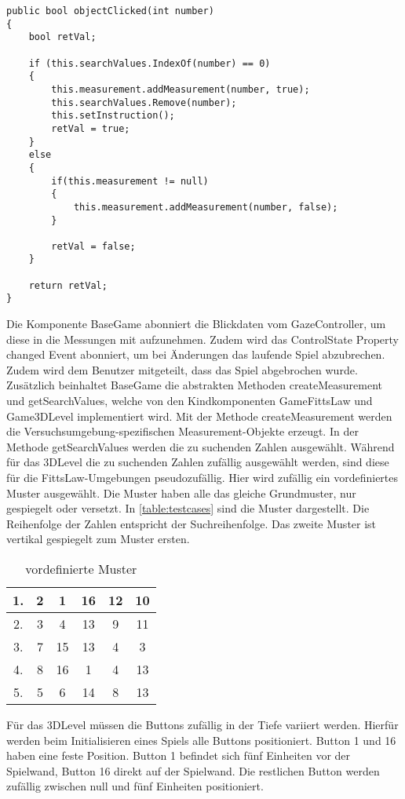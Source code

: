 \begin{lstlisting}[caption=Methode objectClicked,label=lstlisting:objectClicked,float=!htbp]
public bool objectClicked(int number)
{
	bool retVal;
	
	if (this.searchValues.IndexOf(number) == 0)
	{
		this.measurement.addMeasurement(number, true);
		this.searchValues.Remove(number);
		this.setInstruction();
		retVal = true;
	}
	else
	{
		if(this.measurement != null)
		{
			this.measurement.addMeasurement(number, false);
		}
	
		retVal = false;
	}
	
	return retVal;
}
\end{lstlisting}

Die Komponente BaseGame abonniert die Blickdaten vom GazeController, um diese in die Messungen mit aufzunehmen. Zudem wird das ControlState Property changed Event abonniert, um bei Änderungen das laufende Spiel abzubrechen. Zudem wird dem Benutzer mitgeteilt, dass das Spiel abgebrochen wurde. Zusätzlich beinhaltet BaseGame die abstrakten Methoden {\ttfamily createMeasurement} und {\ttfamily getSearchValues}, welche von den Kindkomponenten {\ttfamily GameFittsLaw} und {\ttfamily Game3DLevel} implementiert wird. Mit der Methode createMeasurement werden die Versuchsumgebung-spezifischen Measurement-Objekte erzeugt. In der Methode getSearchValues werden die zu suchenden Zahlen ausgewählt. Während für das 3DLevel die zu suchenden Zahlen zufällig ausgewählt werden, sind diese für die FittsLaw-Umgebungen pseudozufällig. Hier wird zufällig ein vordefiniertes Muster ausgewählt. Die Muster haben alle das gleiche Grundmuster, nur gespiegelt oder versetzt. In \autoref{table:testcases} sind die Muster dargestellt. Die Reihenfolge der Zahlen entspricht der Suchreihenfolge. Das zweite Muster ist vertikal gespiegelt zum Muster ersten. 

\begin{table}[!htbp]
	\centering
	\caption{vordefinierte Muster}
	\label{table:testcases}
	\begin{tabular}{|c ||c c c c c|} 
		\hline
		1. & 2 & 1 & 16 & 12 & 10 \\ 
		\hline
		2. & 3 & 4 & 13 & 9 & 11 \\
		\hline
		3. & 7 & 15 & 13 & 4 & 3 \\
		\hline
		4. & 8 & 16 & 1 & 4 & 13 \\
		\hline
		5. & 5 & 6 & 14 & 8 & 13 \\
		\hline
	\end{tabular}
\end{table}

Für das 3DLevel müssen die Buttons zufällig in der Tiefe variiert werden. Hierfür werden beim Initialisieren eines Spiels alle Buttons positioniert. Button 1 und 16 haben eine feste Position. Button 1 befindet sich fünf Einheiten vor der Spielwand, Button 16 direkt auf der Spielwand. Die restlichen Button werden zufällig zwischen null und fünf Einheiten positioniert.